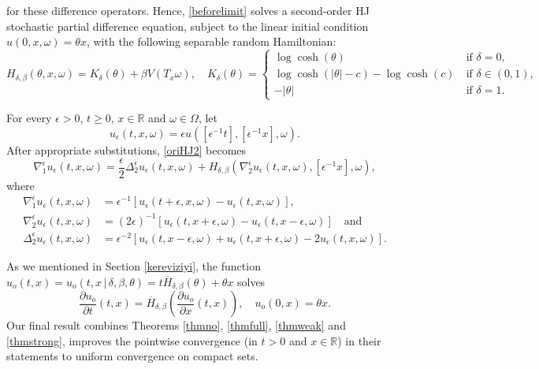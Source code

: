 \documentclass[a4paper]{amsart}
\numberwithin{equation}{section}
\theoremstyle{plain}
\theoremstyle{remark}
\begin{document}
for these difference operators. Hence, \eqref{beforelimit} solves a second-order HJ stochastic partial difference equation, subject to the linear initial condition $u(0,x,\omega) = \theta x$, with the following separable random Hamiltonian:
\begin{equation}\label{orhemi}
H_{\delta,\beta}(\theta,x,\omega) = K_\delta(\theta) + \beta V(T_x\omega),\quad K_\delta(\theta) = \begin{cases}
\log\cosh(\theta)&\ \text{if $\delta = 0$,}\\
\log\cosh(|\theta| - c) - \log\cosh(c)&\ \text{if $\delta\in(0,1)$,}\\
-|\theta|&\ \text{if $\delta = 1$.}\end{cases}
\end{equation}

For every ${\epsilon}>0$, $t\ge0$, $x\in\mathbb{R}$ and $\omega\in\Omega$, let
$$u_{\epsilon}(t,x,\omega) = {\epsilon} u\left([{\epsilon}^{-1}t],[{\epsilon}^{-1}x],\omega\right).$$
After appropriate substitutions, \eqref{oriHJ2} becomes
\begin{equation}\label{resHJ2}
\nabla_1^{\epsilon} u_{\epsilon}(t,x,\omega) = \frac{\epsilon}{2}\Delta_2^{\epsilon} u_{\epsilon}(t,x,\omega) + H_{\delta,\beta}(\nabla_2^{\epsilon} u_{\epsilon}(t,x,\omega),[{\epsilon}^{-1}x],\omega),
\end{equation}
where
\begin{align*}
\nabla_1^{\epsilon} u_{\epsilon}(t,x,\omega) &= {\epsilon}^{-1}[u_{\epsilon}(t+{\epsilon},x,\omega) - u_{\epsilon}(t,x,\omega)],\\
\nabla_2^{\epsilon} u_{\epsilon}(t,x,\omega) &= (2{\epsilon})^{-1}[u_{\epsilon}(t,x+{\epsilon},\omega) - u_{\epsilon}(t,x-{\epsilon},\omega)]\quad\text{and}\\
\Delta_2^{\epsilon} u_{\epsilon}(t,x,\omega) &= {\epsilon}^{-2}[u_{\epsilon}(t,x-{\epsilon},\omega) + u_{\epsilon}(t,x+{\epsilon},\omega) - 2u_{\epsilon}(t,x,\omega)].
\end{align*}

As we mentioned in Section \ref{kereviziyi}, the function
$u_o(t,x) = u_o(t,x\,|\,\delta,\beta,\theta) = t\overline H_{\delta,\beta}(\theta) + \theta x$ solves 
\begin{equation}\label{ihlaravad}
\frac{\partial u_o}{\partial t}(t,x) = \overline H_{\delta,\beta}\left(\frac{\partial u_o}{\partial x}(t,x)\right), \quad
{}{u_o(0,x) = \theta x.}
\end{equation}
Our final result combines Theorems \ref{thmno}, \ref{thmfull}, \ref{thmweak} and \ref{thmstrong}, improves the pointwise convergence (in $t>0$ and $x\in\mathbb{R}$) in their statements to uniform convergence on compact sets.
\end{document}
